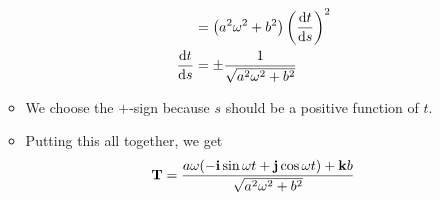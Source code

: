 \documentclass[../main.tex]{subfiles}
\begin{document}
\begin{itemize}
\begin{itemize}
\begin{align*}
            &=\left( a^2\omega^2+b^2 \right)\left( \dv{t}{s} \right)^2\\
            \dv{t}{s} &= \pm\frac{1}{\sqrt{a^2\omega^2+b^2}}
        \end{align*}
        \item We choose the $+$-sign because $s$ should be a positive function of $t$.
        \item Putting this all together, we get
        \begin{equation*}
            \vb{T} = \frac{a\omega(-\vb{i}\sin\omega t+\vb{j}\cos\omega t)+\vb{k}b}{\sqrt{a^2\omega^2+b^2}}
        \end{equation*}
    \end{itemize}
\end{itemize}
\end{document}
